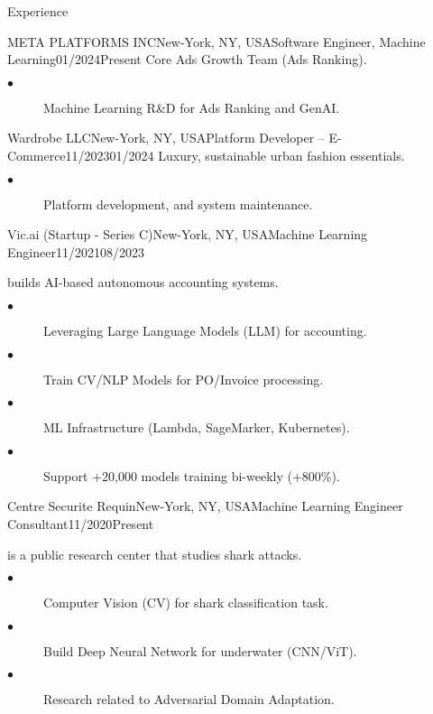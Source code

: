 \documentclass{resume}
\begin{document}
\begin{multicols}{2}
\begin{rSection}{\Large Experience}
		\begin{job}{META PLATFORMS INC}{New-York, NY, USA}{Software Engineer, Machine Learning}{01/2024}{Present}{
			 Core Ads Growth Team (Ads Ranking).
		}
            \begin{description}
				\item[$\bullet$] Machine Learning R\&D for Ads Ranking and GenAI. 
			\end{description}
		\end{job}

  
		\begin{job}{Wardrobe LLC}{New-York, NY, USA}{Platform Developer – E-Commerce}{11/2023}{01/2024}{
			Luxury, sustainable urban fashion essentials.
		}
            \begin{description}
				\item[$\bullet$] Platform development, and system maintenance.
			\end{description}
		\end{job}


		\begin{job}{Vic.ai (Startup - Series C)}{New-York, NY, USA}{Machine Learning Engineer}{11/2021}{08/2023}{
			builds AI-based autonomous accounting systems.
			\begin{description}
				\item[$\bullet$] Leveraging Large Language Models (LLM) for accounting.
				\item[$\bullet$] Train CV/NLP Models for PO/Invoice processing.
				\item[$\bullet$] ML Infrastructure (Lambda, SageMarker, Kubernetes).
				\item[$\bullet$] Support +20,000 models training bi-weekly (+800\%).
			\end{description}
		}
		\end{job}

		\begin{job}{Centre Securite Requin}{New-York, NY, USA}{Machine Learning Engineer Consultant}{11/2020}{Present}{
			is a public research center that studies shark attacks.
			\begin{description}
				\item[$\bullet$] Computer Vision (CV) for shark classification task.
				\item[$\bullet$] Build Deep Neural Network for underwater (CNN/ViT).
				\item[$\bullet$] Research related to Adversarial Domain Adaptation.
			\end{description}
		}
		\end{job}


\end{rSection}
\end{multicols}
\end{document}
